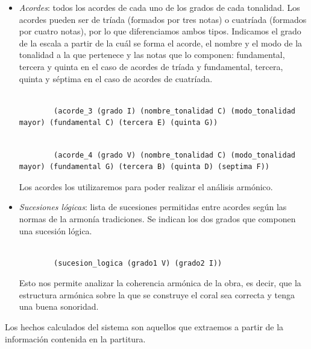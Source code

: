 \begin{itemize}
	\bigskip

	\item \textit{Acordes}: todos los acordes de cada uno de los grados de cada tonalidad. Los acordes pueden ser de tríada (formados por tres notas) o cuatríada (formados por cuatro notas), por lo que diferenciamos ambos tipos. Indicamos el grado de la escala a partir de la cuál se forma el acorde, el nombre y el modo de la tonalidad a la que pertenece y las notas que lo componen: fundamental, tercera y quinta en el caso de acordes de tríada y fundamental, tercera, quinta y séptima en el caso de acordes de cuatríada.

	\begin{lstlisting}

		(acorde_3 (grado I) (nombre_tonalidad C) (modo_tonalidad mayor) (fundamental C) (tercera E) (quinta G))

	\end{lstlisting}

	\begin{lstlisting}

		(acorde_4 (grado V) (nombre_tonalidad C) (modo_tonalidad mayor) (fundamental G) (tercera B) (quinta D) (septima F))

	\end{lstlisting}

	Los acordes los utilizaremos para poder realizar el análisis armónico.

	\bigskip

	\item \textit{Sucesiones lógicas}: lista de sucesiones permitidas entre acordes según las normas de la armonía tradiciones. Se indican los dos grados que componen una sucesión lógica.

	\begin{lstlisting}

		(sucesion_logica (grado1 V) (grado2 I))

	\end{lstlisting} 

	Esto nos permite analizar la coherencia armónica de la obra, es decir, que la estructura armónica sobre la que se construye el coral sea correcta y tenga una buena sonoridad.

\end{itemize}

\bigskip

Los hechos calculados del sistema son aquellos que extraemos a partir de la información contenida en la partitura.


